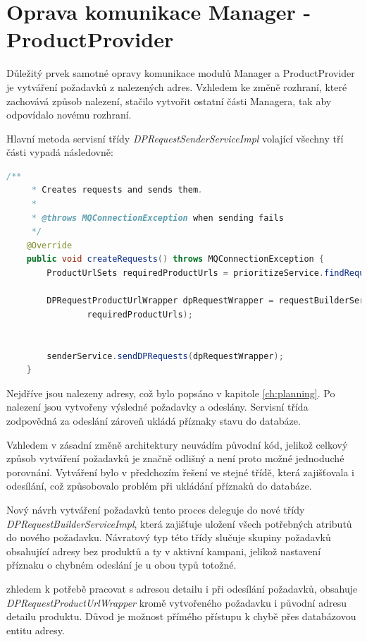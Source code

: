 \documentclass[thesis=B,czech]{FITthesis}[2012/06/26]
\begin{document}
\section{Oprava komunikace Manager - ProductProvider}
Důležitý prvek samotné opravy komunikace modulů Manager a ProductProvider je vytváření požadavků z nalezených adres.
Vzhledem ke změně rozhraní, které zachovává způsob nalezení, stačilo vytvořit ostatní části Managera, tak aby odpovídalo novému rozhraní.
\par
Hlavní metoda servisní třídy \textit{DPRequestSenderServiceImpl} volající všechny tří části vypadá následovně:
\begin{lstlisting}[language=Java]
    /**
     * Creates requests and sends them.
     *
     * @throws MQConnectionException when sending fails
     */
    @Override
    public void createRequests() throws MQConnectionException {
        ProductUrlSets requiredProductUrls = prioritizeService.findRequiredProductUrls();

        DPRequestProductUrlWrapper dpRequestWrapper = requestBuilderService.create(
                requiredProductUrls);


        senderService.sendDPRequests(dpRequestWrapper);
    }
\end{lstlisting}
Nejdříve jsou nalezeny adresy, což bylo popsáno v kapitole \ref{ch:planning}. Po nalezení jsou vytvořeny výsledné požadavky
a odeslány. Servisní třída zodpovědná za odeslání zároveň ukládá příznaky stavu do databáze.
\par
Vzhledem v zásadní změně architektury neuvádím původní kód, jelikož celkový způsob vytváření požadavků je značně odlišný a není proto možné jednoduché porovnání. Vytváření bylo v předchozím řešení ve stejné třídě, která zajišťovala i odesílání, což způsobovalo problém při ukládání příznaků do databáze.
\par
Nový návrh vytváření požadavků tento proces deleguje do nové 
třídy  \\ \textit{DPRequestBuilderServiceImpl}, která zajišťuje uložení všech potřebných atributů do nového požadavku. Návratový typ této třídy slučuje skupiny požadavků obsahující adresy bez produktů a ty v aktivní kampani, jelikož nastavení příznaku o chybném odeslání je u obou typů
totožné.
\par
zhledem k potřebě pracovat s adresou detailu i při odesílání požadavků, obsahuje \textit{DPRequestProductUrlWrapper} kromě vytvořeného požadavku
i původní adresu detailu produktu. Důvod je možnost přímého přístupu k chybě přes databázovou entitu adresy.
\end{document}
